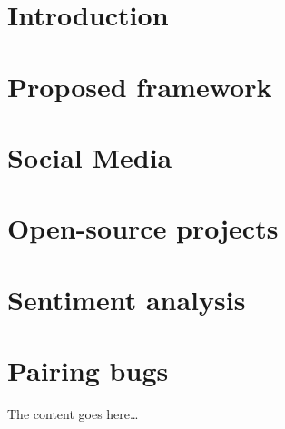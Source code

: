 \documentclass[a4paper,11pt,pdftex,halfparskip,cleardoubleempty]{scrbook}
\begin{document}

\cleardoublepage
\tableofcontents 
\cleardoublepage
{}
\pagestyle{plain} 

\chapter{Introduction}
\label{chp:introduction}
 
 
\chapter{Proposed framework}
\label{chp:proposedFramework}




\chapter{Social Media}
\label{chp:socialMedia}



\chapter{Open-source projects}
\label{chp:ossProjects}



\chapter{Sentiment analysis}
\label{chp:sentimentAnalysis}


\chapter{Pairing bugs}
\label{chp:pairingBugs}




\label{sec:introduction}

The content goes here\ldots
\newpage
\nocite{*}


\end{document}
